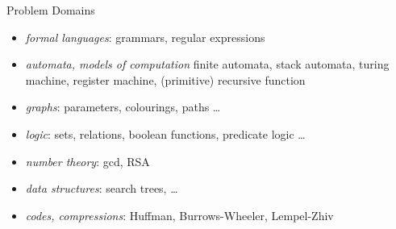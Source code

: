 \begin{slide}{Problem Domains}

\begin{itemize}\itemsep 2pt
\item
  \emph{formal languages}:  
  grammars, regular expressions
\item
  \emph{automata, models of computation}
  finite automata, stack automata, turing machine, register machine,
  (primitive) recursive function
\item
  \emph{graphs}: parameters,  colourings, paths \dots
\item
  \emph{logic}: sets, relations, boolean functions, predicate logic \dots
\item
  \emph{number theory}: gcd, RSA
\item
  \emph{data structures}: search trees, \dots
\item
  \emph{codes, compressions}: Huffman, Burrows-Wheeler, Lempel-Zhiv
\end{itemize}

\end{slide}
